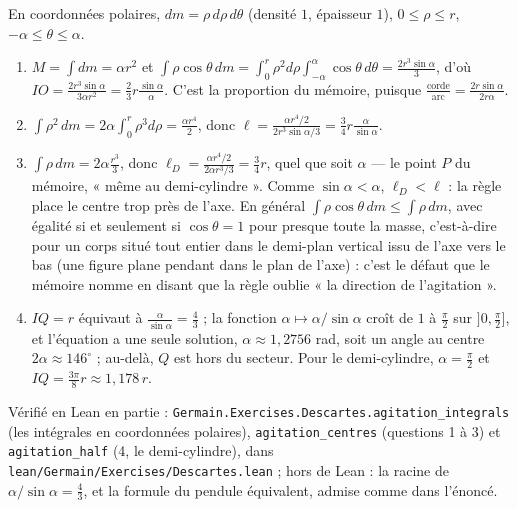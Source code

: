 \documentclass[11pt,a4paper]{article}
\begin{document}
\begin{solution}
En coordonnées polaires, $dm = \rho\,d\rho\,d\theta$ (densité $1$, épaisseur $1$),
$0 \le \rho \le r$, $-\alpha \le \theta \le \alpha$.
\begin{enumerate}
\item $M = \int dm = \alpha r^2$ et $\int\rho\cos\theta\,dm = \int_0^r\rho^2d\rho
  \int_{-\alpha}^{\alpha}\cos\theta\,d\theta = \frac{2r^3\sin\alpha}{3}$, d'où
  $IO = \frac{2r^3\sin\alpha}{3\alpha r^2} = \frac23r\frac{\sin\alpha}{\alpha}$.
  C'est la proportion du mémoire, puisque $\frac{\text{corde}}{\text{arc}} =
  \frac{2r\sin\alpha}{2r\alpha}$.
\item $\int\rho^2\,dm = 2\alpha\int_0^r\rho^3d\rho = \frac{\alpha r^4}{2}$, donc
  $\ell = \frac{\alpha r^4/2}{2r^3\sin\alpha/3} = \frac34 r\frac{\alpha}{\sin\alpha}$.
\item $\int\rho\,dm = 2\alpha\frac{r^3}{3}$, donc $\ell_D = \frac{\alpha r^4/2}{2\alpha
  r^3/3} = \frac34r$, quel que soit $\alpha$ --- le point $P$ du mémoire, « même au
  demi-cylindre ». Comme $\sin\alpha < \alpha$, $\ell_D < \ell$ : la règle place le
  centre trop près de l'axe. En général $\int\rho\cos\theta\,dm \le \int\rho\,dm$,
  avec égalité si et seulement si $\cos\theta = 1$ pour presque toute la masse,
  c'est-à-dire pour un corps situé tout entier dans le demi-plan vertical issu de
  l'axe vers le bas (une figure plane pendant dans le plan de l'axe) : c'est le
  défaut que le mémoire nomme en disant que la règle oublie « la direction de
  l'agitation ».
\item $IQ = r$ équivaut à $\frac{\alpha}{\sin\alpha} = \frac43$ ; la fonction
  $\alpha \mapsto \alpha/\sin\alpha$ croît de $1$ à $\frac{\pi}{2}$ sur
  $]0, \frac{\pi}{2}]$, et l'équation a une seule solution, $\alpha \approx
  1{,}2756$ rad, soit un angle au centre $2\alpha \approx 146^\circ$ ; au-delà, $Q$
  est hors du secteur. Pour le demi-cylindre, $\alpha = \frac{\pi}{2}$ et
  $IQ = \frac{3\pi}{8}r \approx 1{,}178\,r$.
\end{enumerate}

Vérifié en Lean en partie : \texttt{Germain.Exercises.Descartes.agitation\_integrals} (les
intégrales en coordonnées polaires), \texttt{agitation\_centres} (questions 1 à 3) et
\texttt{agitation\_half} (4, le demi-cylindre), dans \texttt{lean/Germain/Exercises/Descartes.lean} ; hors de Lean : la
racine de $\alpha/\sin\alpha = \frac43$, et la formule du pendule équivalent, admise comme dans
l'énoncé.
\end{solution}
\end{document}
